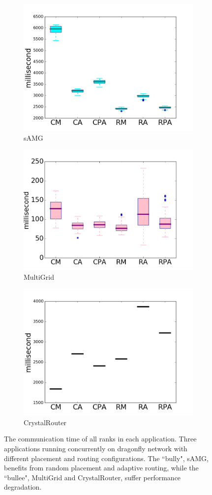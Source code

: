 \documentclass[conference,compsoc]{IEEEtran}
\begin{document}
\begin{figure}[t!]
    \centering
    \begin{subfigure}[t]{0.32\textwidth}
        \centering
        \includegraphics[height=1.5 in]{syn-wkld/amg10/commtime}
        \caption{sAMG}
        \label{fig:syn-samg-commtime}
    \end{subfigure}%
    \hspace{1em}%
    \begin{subfigure}[t]{0.32\textwidth}
        \centering
        \includegraphics[height=1.5 in]{syn-wkld/mg/commtime}
        \caption{MultiGrid}
        \label{fig:syn-mg-commtime}
    \end{subfigure}%
    \begin{subfigure}[t]{0.32\textwidth}
        \centering
        \includegraphics[height=1.5 in]{syn-wkld/cr/commtime}
        \caption{CrystalRouter}
        \label{fig:syn-cr-commtime}
    \end{subfigure}%
   \caption{The communication time of all ranks in each application. Three applications running concurrently on dragonfly network with different placement and routing configurations. The ``bully", sAMG, benefits from random placement and adaptive routing, while the ``bullee", MultiGrid and CrystalRouter, suffer performance degradation.}
   \label{fig:syn-apps-commtime}
\end{figure}
\end{document}
